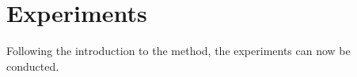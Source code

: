 \chapter{Experiments}

Following the introduction to the method, the experiments can now be conducted. 


